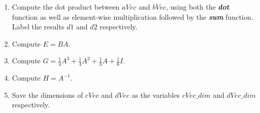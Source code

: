 \documentclass[11pt]{article}
\newenvironment{qparts}{\begin{enumerate}[{(}a{)}]}{\end{enumerate}}
\begin{document}
\begin{qparts}

    \item  Compute the dot product between $aVec$ and $bVec$, using both the
    \textbf{\textit{dot}} function as well as element-wise multiplication
    followed by the \textbf{\textit{sum}} function.
    Label the results $d1$ and $d2$ respectively.

    \item Compute $E = BA$.

    \item Compute 
    $G = \frac{1}{4}A^3 + \frac{1}{4}A^2 + \frac{1}{3}A + \frac{1}{6}I$. 

    \item Compute $H = A^{-1}$.

    \item Save the dimensions of $cVec$ and $dVec$ as the variables $cVec\_dim$ and
    $dVec\_dim$ respectively.

\end{qparts}
\end{document}
